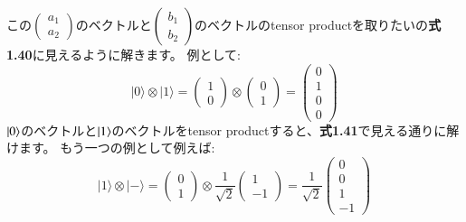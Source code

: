 この$
\left(\begin{array}{l}
a_1 \\
a_2
\end{array}\right)$のベクトルと$\left(\begin{array}{l}
b_1 \\
b_2
\end{array}\right)$のベクトルのtensor productを取りたいの\textbf{式1.40}に見えるように解きます。
例として:
\begin{equation}
|0\rangle \otimes|1\rangle=\left(\begin{array}{l}
1 \\
0
\end{array}\right) \otimes\left(\begin{array}{l}
0 \\
1
\end{array}\right)=\left(\begin{array}{l}
0 \\
1 \\
0 \\
0
\end{array}\right)
\end{equation}
$\ket{0}$のベクトルと$\ket{1}$のベクトルをtensor productすると、\textbf{式1.41}で見える通りに解けます。
もう一つの例として例えば:
\begin{equation}
|1\rangle \otimes|-\rangle=\left(\begin{array}{l}
0 \\
1
\end{array}\right) \otimes \frac{1}{\sqrt{2}}\left(\begin{array}{c}
1 \\
-1
\end{array}\right)=\frac{1}{\sqrt{2}}\left(\begin{array}{c}
0 \\
0 \\
1 \\
-1
\end{array}\right)
\end{equation}

